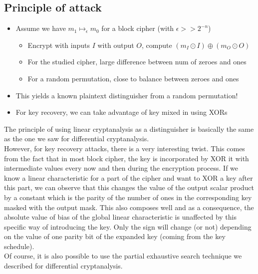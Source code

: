 	\subsection{Principle of attack}
		\begin{itemize}
		    \item Assume we have $m_1 \mapsto_{\epsilon} m_0$ for a block cipher (with $\epsilon >> 2^{-n}$)
		    \begin{itemize}
		        \item Encrypt with inputs $I$ with output $O$, compute $(m_I \odot I) \oplus (m_O \odot O)$
		        \item For the studied cipher, large difference between num of zeroes and ones
		        \item For a random permutation, close to balance between zeroes and ones
		    \end{itemize}
		    \item This yields a known plaintext distinguisher from a random permutation!
		    \item For key recovery, we can take advantage of key mixed in using XORs
		\end{itemize}
		The principle of using linear cryptanalysis as a distinguisher is basically the same as the one we saw for differential cryptanalysis.\\
		However, for key recovery attacks, there is a very interesting twist. 
		This comes from the fact that in most block cipher, the key is incorporated by XOR it with intermediate values every now and then during the encryption process. 
		If we know a linear characteristic for a part of the cipher and want to XOR a key after this part, we can observe that this changes the value of the output scalar product 
		by a constant which is the parity of the number of ones in the corresponding key masked with the output mask. 
		This also composes well and as a consequence, the absolute value of bias of the global linear characteristic is unaffected by this specific way of introducing the key. 
		Only the sign will change (or not) depending on the value of one parity bit of the expanded key (coming from the key schedule).\\
		Of course, it is also possible to use the partial exhaustive search technique we described for differential cryptanalysis.

